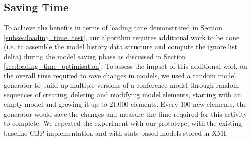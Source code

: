 \documentclass{llncs}
\begin{document}
\subsection{Saving Time}
\label{subsec:saving_time_test}

To achieve the benefits in terms of loading time demonstrated in Section \ref{subsec:loading_time_test}, our algorithm requires additional work to be done (i.e. to assemble the model history data structure and compute the ignore list delta) during the model saving phase as discussed in Section \ref{sec:loading_time_optimisation}. To assess the impact of this additional work on the overall time required to save changes in models, we used a random model generator to build up multiple versions of a conference model through random sequences of creating, deleting and modifying model elements, starting with an empty model and growing it up to 21,000 elements. Every 100 new elements, the generator would save the changes and measure the time required for this activity to complete. We repeated the experiment with our prototype, with the existing baseline CBP implementation and with state-based models stored in XMI.
\end{document}
